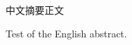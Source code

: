 \begin{cabstract}
	中文摘要正文
	\jlutexffaq
\end{cabstract}
\begin{eabstract}
	Test of the English abstract.
\end{eabstract}